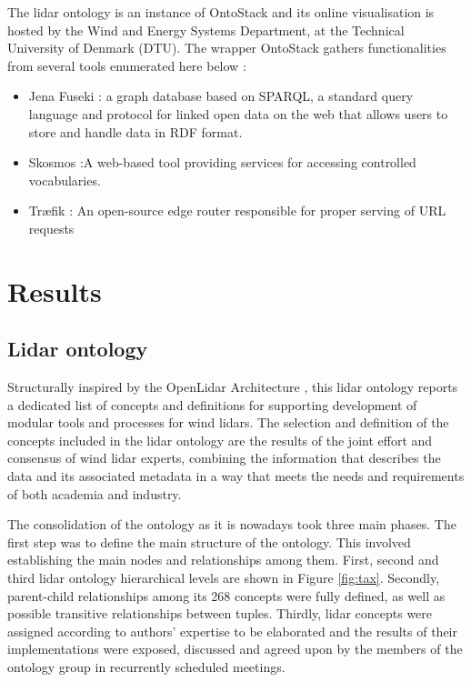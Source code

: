 \documentclass[remotesensing,article,submit,pdftex,moreauthors]{Definitions/mdpi}
\begin{document}
\begin{description}
    The lidar ontology is an instance of OntoStack and its online visualisation is hosted by the Wind and Energy Systems Department, at the Technical University  of Denmark (DTU).
    The wrapper OntoStack gathers functionalities from several tools enumerated here below \cite{ref-github-sheet2rdf}:
    \begin{itemize}
        \item Jena Fuseki \cite{ref-JenaFuseki}: a graph database based on SPARQL, a standard query language and protocol for linked open data on the web \cite{ref-SPARQL} that allows users to store and handle data in RDF format.
        \item Skosmos \cite{ref-Skosmos}:A web-based tool providing services for accessing controlled vocabularies.
        \item Tr\ae fik \cite{ref-Traefik}: An open-source edge router responsible for proper serving of URL requests 
    \end{itemize}
\end{description}


\section{Results}
\label{sec:Results}

\subsection{Lidar ontology}

Structurally inspired by the OpenLidar Architecture \cite{}, this lidar ontology reports a dedicated list of concepts and definitions for supporting development of modular tools and processes for wind lidars. The selection and definition of the concepts included in the lidar ontology are the results of the joint effort and consensus of wind lidar experts, combining the information that describes the data and its associated metadata in a way that meets the needs and requirements of both academia and industry.

The consolidation of the ontology as it is nowadays took three main phases. The first step was to define the main structure of the ontology. This involved establishing the main nodes and relationships among them. First, second and third lidar ontology hierarchical levels are shown in Figure \ref{fig:tax}. Secondly, parent-child relationships among its 268 concepts were fully defined, as well as possible transitive relationships between tuples. Thirdly, lidar concepts were assigned according to authors' expertise to be elaborated and the results of their implementations were exposed, discussed and agreed upon by the members of the ontology group in recurrently scheduled meetings.
\end{document}
